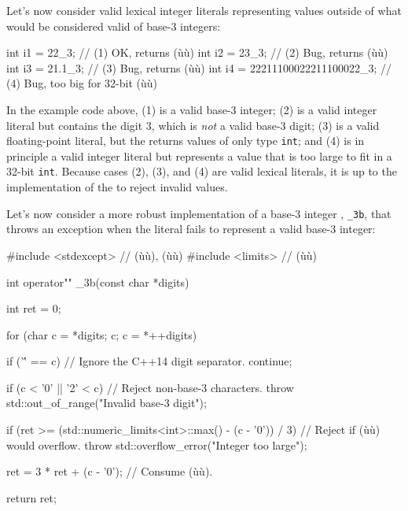 Let's now consider valid lexical integer literals representing values
outside of what would be considered valid of base-3 integers:

\begin{emcppslisting}[emcppsbatch=e11]
int i1 = 22_3;                    // (1) OK, returns (ù{}ù)
int i2 = 23_3;                    // (2) Bug, returns (ù{}ù)
int i3 = 21.1_3;                  // (3) Bug, returns (ù{}ù)
int i4 = 22211100022211100022_3;  // (4) Bug, too big for 32-bit (ù{}ù)
\end{emcppslisting}
    
\noindent In the example code above, (1) is a valid base-3 integer; (2) is a valid
integer literal but contains the digit 3, which is \emph{not} a valid
base-3 digit; (3) is a valid floating-point literal, but the  returns values of only type \lstinline!int!; and (4) is in
principle a valid integer literal but represents a value that is too
large to fit in a 32-bit \lstinline!int!. Because cases (2), (3), and (4)
are valid lexical literals, it is up to the implementation of the
 to reject invalid values.

Let's now consider a more robust implementation of a base-3 integer
, \lstinline!_3b!, that throws an exception when the literal
fails to represent a valid base-3 integer:

\begin{emcppslisting}
#include <stdexcept>  // (ù{}ù), (ù{}ù)
#include <limits>     // (ù{}ù)

int operator"" _3b(const char *digits)
{
    int ret = 0;

    for (char c = *digits; c; c = *++digits)
    {
        if ('\'' == c)  // Ignore the C++14 digit separator.
        {
            continue;
        }

        if (c < '0' || '2' < c)  // Reject non-base-3 characters.
        {
            throw std::out_of_range("Invalid base-3 digit");
        }

        if (ret >= (std::numeric_limits<int>::max() - (c - '0')) / 3)
        {
            // Reject if (ù{}ù) would overflow.
            throw std::overflow_error("Integer too large");
        }

        ret = 3 * ret + (c - '0');  // Consume (ù{}ù).
    }

    return ret;
}
\end{emcppslisting}
    
